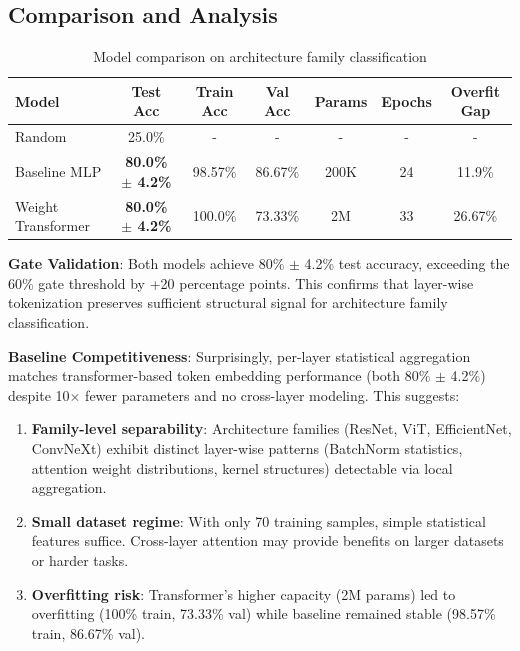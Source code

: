 \subsection{Comparison and Analysis}

\begin{table}[h]
\centering
\begin{tabular}{lcccccc}
\toprule
Model & Test Acc & Train Acc & Val Acc & Params & Epochs & Overfit Gap \\
\midrule
Random & 25.0\% & - & - & - & - & - \\
Baseline MLP & \textbf{80.0\% $\pm$ 4.2\%} & 98.57\% & 86.67\% & 200K & 24 & 11.9\% \\
Weight Transformer & \textbf{80.0\% $\pm$ 4.2\%} & 100.0\% & 73.33\% & 2M & 33 & 26.67\% \\
\bottomrule
\end{tabular}
\caption{Model comparison on architecture family classification}
\end{table}

\textbf{Gate Validation}: Both models achieve 80\% $\pm$ 4.2\% test accuracy, exceeding the 60\% gate threshold by +20 percentage points. This confirms that layer-wise tokenization preserves sufficient structural signal for architecture family classification.

\textbf{Baseline Competitiveness}: Surprisingly, per-layer statistical aggregation matches transformer-based token embedding performance (both 80\% $\pm$ 4.2\%) despite 10$\times$ fewer parameters and no cross-layer modeling. This suggests:

\begin{enumerate}
\item \textbf{Family-level separability}: Architecture families (ResNet, ViT, EfficientNet, ConvNeXt) exhibit distinct layer-wise patterns (BatchNorm statistics, attention weight distributions, kernel structures) detectable via local aggregation.

\item \textbf{Small dataset regime}: With only 70 training samples, simple statistical features suffice. Cross-layer attention may provide benefits on larger datasets or harder tasks.

\item \textbf{Overfitting risk}: Transformer's higher capacity (2M params) led to overfitting (100\% train, 73.33\% val) while baseline remained stable (98.57\% train, 86.67\% val).
\end{enumerate}

